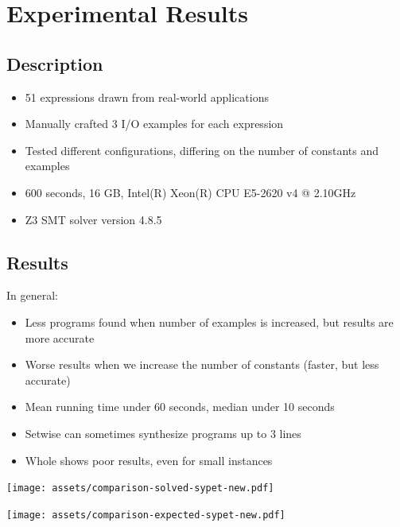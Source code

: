 \documentclass[notes=hide]{beamer}
\begin{document}
\section{Experimental Results} %

\subsection{Description} %
\begin{frame}{\secname}{\subsecname}
  \begin{itemize}
  \item 51 expressions drawn from real-world applications
  \item Manually crafted 3 I/O examples for each expression
  \item Tested different configurations, differing on the number of constants
    and examples
  \item 600 seconds, 16 GB, Intel(R) Xeon(R) CPU E5-2620 v4 @ 2.10GHz
  \item Z3 SMT solver version 4.8.5
  \end{itemize}
\end{frame}

\subsection{Results} %
\begin{frame}{\secname}{\subsecname}
  In general:
  \begin{itemize}
  \item Less programs found when number of examples is increased, but results
    are more accurate
  \item Worse results when we increase the number of constants (faster, but less
    accurate) 
  \item Mean running time under 60 seconds, median under 10 seconds
  \item Setwise can sometimes synthesize programs up to 3 lines
  \item Whole shows poor results, even for small instances
  \end{itemize}
\end{frame}
\begin{frame}
  \texttt{[image: assets/comparison-solved-sypet-new.pdf]}
\end{frame}
\begin{frame}
  \texttt{[image: assets/comparison-expected-sypet-new.pdf]}
\end{frame}
\end{document}
